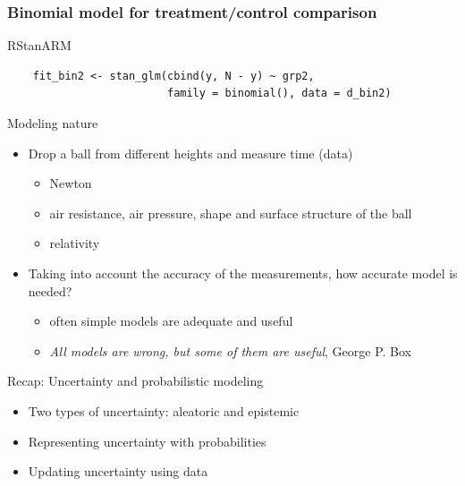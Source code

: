 \documentclass[10pt]{beamer}
\begin{document}
\begin{frame}[fragile]
  \frametitle{Binomial model for treatment/control comparison}

  RStanARM
  {\scriptsize
  \begin{lstlisting}
    fit_bin2 <- stan_glm(cbind(y, N - y) ~ grp2,
                         family = binomial(), data = d_bin2)
  \end{lstlisting}
}
\end{frame}


\begin{frame}{Modeling nature}

  \begin{itemize}
  \item Drop a ball from different heights and measure time (data)
    \pause
    \begin{itemize}
    \item Newton
    \item air resistance, air pressure, shape and surface structure of the ball
    \item relativity
    \end{itemize}
    \pause
  \item Taking into account the accuracy of the measurements, how
    accurate model is needed?
    \pause
    \begin{itemize}
    \item often simple models are adequate and useful
    \item \emph{All models are wrong, but some of them are useful},
      George P. Box
    \end{itemize}
  \end{itemize}

\end{frame}

\begin{frame}{Recap: Uncertainty and probabilistic modeling}

  \begin{itemize}
  \item Two types of uncertainty: aleatoric and epistemic
    \vspace{\baselineskip}
  \item Representing uncertainty with probabilities
    \vspace{\baselineskip}
  \item Updating uncertainty using data
    \vspace{\baselineskip}
   \end{itemize}
\end{frame}
\end{document}
